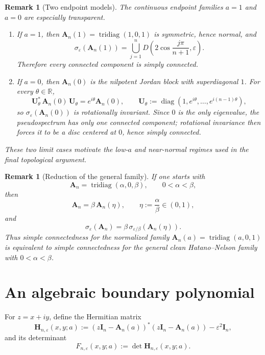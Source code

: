 \documentclass[11pt]{article}
\newtheorem{remark}[theorem]{Remark}
\DeclareMathOperator{\diag}{diag}
\DeclareMathOperator{\tridiag}{tridiag}
\newcommand{\R}{\mathbb{R}}
\begin{document}
\begin{remark}[Two endpoint models]\label{rem:endpoints}
The continuous endpoint families \(a=1\) and \(a=0\) are especially transparent.

\begin{enumerate}
\item If \(a=1\), then \(\mathbf A_n(1)=\tridiag(1,0,1)\) is symmetric, hence normal, and
\[
\sigma_\varepsilon(\mathbf A_n(1))
=
\bigcup_{j=1}^n
D\!\left(2\cos\frac{j\pi}{n+1},\varepsilon\right).
\]
Therefore every connected component is simply connected.

\item If \(a=0\), then \(\mathbf A_n(0)\) is the nilpotent Jordan block with superdiagonal \(1\). For every \(\theta\in\R\),
\[
\mathbf U_\theta^*\,\mathbf A_n(0)\,\mathbf U_\theta
=
e^{i\theta}\mathbf A_n(0),
\qquad
\mathbf U_\theta:=\diag(1,e^{i\theta},\dots,e^{i(n-1)\theta}),
\]
so \(\sigma_\varepsilon(\mathbf A_n(0))\) is rotationally invariant. Since \(0\) is the only eigenvalue, the pseudospectrum has only one connected component; rotational invariance then forces it to be a disc centered at \(0\), hence simply connected.
\end{enumerate}

These two limit cases motivate the low-\(a\) and near-normal regimes used in the final topological argument.
\end{remark}

\begin{remark}[Reduction of the general family]\label{rem:general-b}
If one starts with
\[
\mathbf A_n=\tridiag(\alpha,0,\beta),
\qquad
0<\alpha<\beta,
\]
then
\[
\mathbf A_n=\beta\,\mathbf A_n(\eta),
\qquad
\eta:=\frac{\alpha}{\beta}\in(0,1),
\]
and
\[
\sigma_\varepsilon(\mathbf A_n)
=
\beta\,\sigma_{\varepsilon/\beta}(\mathbf A_n(\eta)).
\]
Thus simple connectedness for the normalized family \(\mathbf A_n(a)=\tridiag(a,0,1)\) is equivalent to simple connectedness for the general clean Hatano--Nelson family with \(0<\alpha<\beta\).
\end{remark}

\section{An algebraic boundary polynomial}

For \(z=x+iy\), define the Hermitian matrix
\[
\mathbf H_{n,\varepsilon}(x,y;a)
:=
(z\mathbf I_n-\mathbf A_n(a))^*(z\mathbf I_n-\mathbf A_n(a))
-\varepsilon^2\mathbf I_n,
\]
and its determinant
\[
F_{n,\varepsilon}(x,y;a)
:=
\det \mathbf H_{n,\varepsilon}(x,y;a).
\]
\end{document}
